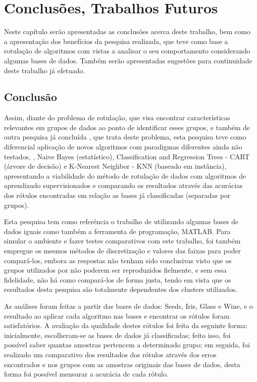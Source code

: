 \chapter{Conclusões, Trabalhos Futuros}\label{cap:conclusao} 

Neste capítulo serão apresentadas as conclusões acerca deste trabalho, bem como a apresentação dos benefícios da pesquisa realizada, que teve como base a rotulação de algoritmos com vistas a analisar o seu comportamento considerando algumas bases de dados. Também serão apresentadas sugestões para continuidade deste trabalho já efetuado. 

\section{Conclusão}\label{cond}




Assim, diante do problema de rotulação, que visa encontrar características relevantes em grupos de dados ao ponto de identificar esses grupos, e também de outra pesquisa já concluída \cite{Lopes2016}, que trata deste problema, esta pesquisa teve como diferencial aplicação de novos algoritmos com paradigmas diferentes ainda não testados, , Naive Bayes (estatístico), Classification and Regression Trees - CART (árvore de decisão) e K-Nearest Neighbor - KNN (baseado em instância), apresentando a viabilidade do método de rotulação de dados com algoritmos de aprendizado supervisionados e comparando os resultados através das acurácias dos rótulos encontradas em relação as bases já classificadas (separadas por grupos).

Esta pesquisa tem como referência o trabalho de  utilizando algumas bases de dados iguais como também a ferramenta de programação, MATLAB. Para simular o ambiente e fazer testes comparativos com este trabalho, foi também empregue os mesmos  métodos de discretização e valores das faixas para poder compará-los, embora as respostas não tenham sido conclusivas visto que os grupos utilizados por \cite{Lopes2016} não poderem ser reproduzidos fielmente, e sem essa fidelidade, não há como compará-los de forma justa, tendo em vista que os resultados desta pesquisa são totalmente dependentes dos clusters utilizados.


As análises foram feitas a partir das bases de dados: Seeds, Iris, Glass e Wine, e o resultado ao aplicar cada algoritmo nas bases e encontrar os rótulos foram satisfatórios. A avaliação da qualidade destes rótulos foi feita da seguinte forma: inicialmente, escolheram-se as bases de dados já classificadas; feito isso, foi possível saber quantas amostras pertencem a determinado grupo; em seguida, foi realizado um comparativo dos resultados dos rótulos através dos erros encontrados e nos grupos com as amostras originais das bases de dados, desta forma foi possível mensurar a acurácia de cada rótulo. 

